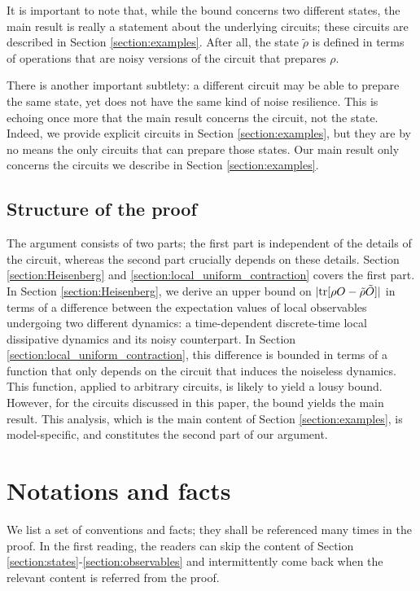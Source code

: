 \documentclass[prx,aps,amsmath,amssymb,floatfix,superscriptaddress,11pt,tightenlines,longbibliography,onecolumn,notitlepage]{revtex4-1}
\newcommand{\Tr}{\textnormal{tr}}
\begin{document}
It is important to note that, while the bound concerns two different states, the main result is really a statement about the underlying circuits; these circuits are described in Section \ref{section:examples}. After all, the state $\tilde{\rho}$ is defined in terms of operations that are noisy versions of the circuit that prepares $\rho$.

There is another important subtlety: a different circuit may be able to prepare the same state, yet does not have the same kind of noise resilience. This is echoing once more that the main result concerns the circuit, not the state. Indeed, we provide explicit circuits in Section \ref{section:examples}, but they are by no means the only circuits that can prepare those states. Our main result only concerns the circuits we describe in Section \ref{section:examples}.

\subsection{Structure of the proof\label{section:proof_sketch}}
The argument consists of two parts; the first part is independent of the details of the circuit, whereas the second part crucially depends on these details. Section \ref{section:Heisenberg} and \ref{section:local_uniform_contraction} covers the first part. In Section \ref{section:Heisenberg}, we derive an upper bound on $|\Tr[\rho O - \tilde{\rho}\tilde{O}]|$ in terms of a difference between the expectation values of local observables undergoing two different dynamics: a time-dependent discrete-time local dissipative dynamics and its noisy counterpart. In Section \ref{section:local_uniform_contraction}, this difference is bounded in terms of a function that only depends on the circuit that induces the noiseless dynamics. This function, applied to arbitrary circuits, is likely to yield a lousy bound. However, for the circuits discussed in this paper, the bound yields the main result. This analysis, which is the main content of Section \ref{section:examples}, is model-specific, and constitutes the second part of our argument.

\section{Notations and facts\label{section:ref}}
We list a set of conventions and facts; they shall be referenced many times in the proof. In the first reading, the readers can skip the content of Section \ref{section:states}-\ref{section:observables} and intermittently come back when the relevant content is referred from the proof. 
\end{document}
